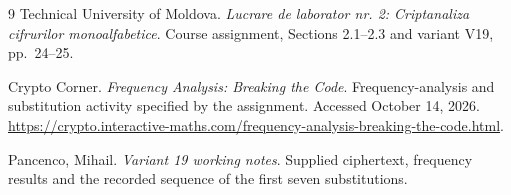 \begin{thebibliography}{9}
\singlespace\normalsize
{}
Technical University of Moldova.
\textit{Lucrare de laborator nr. 2: Criptanaliza cifrurilor monoalfabetice}.
Course assignment, Sections 2.1--2.3 and variant V19, pp.~24--25.

Crypto Corner. \textit{Frequency Analysis: Breaking the Code}.
Frequency-analysis and substitution activity specified by the assignment.
Accessed October 14, 2026.
\url{https://crypto.interactive-maths.com/frequency-analysis-breaking-the-code.html}.

Pancenco, Mihail. \textit{Variant 19 working notes}.
Supplied ciphertext, frequency results and the recorded sequence of the
first seven substitutions.
\end{thebibliography}

